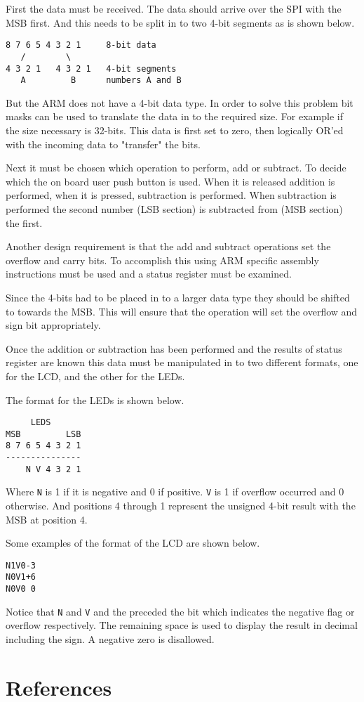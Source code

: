 \documentclass{article}
\begin{document}
First the data must be received.
The data should arrive over the SPI with the MSB first.
And this needs to be split in to two 4-bit segments
as is shown below.

\begin{verbatim}
8 7 6 5 4 3 2 1     8-bit data
   /        \
4 3 2 1   4 3 2 1   4-bit segments
   A         B      numbers A and B
\end{verbatim}

But the ARM does not have a 4-bit data type.
In order to solve this problem bit masks can be used to
translate the data in to the required size.
For example if the size necessary is 32-bits.
This data is first set to zero, then logically OR'ed with
the incoming data to "transfer" the bits.

Next it must be chosen which operation to perform, add or subtract.
To decide which the on board user push button\cite[Pg. 17]{UM1079}
is used.  When it is released addition is performed, when it
is pressed, subtraction is performed.
When subtraction is performed the second number (LSB section)
is subtracted from (MSB section) the first.


Another design requirement is that the add and subtract operations
set the overflow and carry bits.
To accomplish this using ARM specific assembly instructions
must be used \cite[Pg. 50]{furber2000arm} and a status
register must be examined\cite[Pg. 40]{furber2000arm}.

Since the 4-bits had to be placed in to a larger data type
they should be shifted to towards the MSB.
This will ensure that the operation will set the overflow and
sign bit appropriately.

Once the addition or subtraction has been performed and the
results of status register are known this data must be
manipulated in to two different formats, one for the LCD,
and the other for the LEDs.

The format for the LEDs is shown below.
\begin{verbatim}
     LEDS
MSB         LSB
8 7 6 5 4 3 2 1
---------------
    N V 4 3 2 1 
\end{verbatim}
Where \verb+N+ is 1 if it is negative and 0 if positive.
\verb+V+ is 1 if overflow occurred and 0 otherwise.
And positions 4 through 1 represent the unsigned 4-bit result
with the MSB at position 4.

Some examples of the format of the LCD are shown below.
\begin{verbatim}
N1V0-3
N0V1+6
N0V0 0
\end{verbatim}
Notice that \verb+N+ and \verb+V+ and the preceded the bit which
indicates the negative flag or overflow respectively.
The remaining space is used to display the result in decimal including the sign.
A negative zero is disallowed.


\clearpage

\pagebreak
\renewcommand*{\refname}{\vspace{-8mm}}
\section{References}
%


\end{document}
